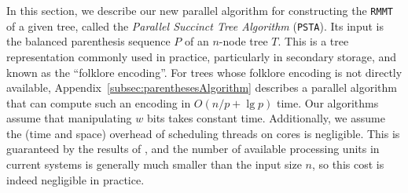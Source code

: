 In this section, we describe our new parallel algorithm for constructing
the {\tt RMMT} of a given tree, called the \emph{Parallel Succinct Tree
  Algorithm} ({\tt PSTA}).
Its input is the balanced parenthesis sequence $P$ of an $n$-node
tree $T$.
This is a tree representation commonly used in practice, particularly in
secondary storage, and known as the ``folklore encoding''.
For trees whose folklore encoding is not directly available,
Appendix~\ref{subsec:parenthesesAlgorithm} describes a parallel algorithm that
can compute such an encoding in $O(n/p + \lg p)$ time.
Our algorithms assume that manipulating $w$ bits takes constant time.
Additionally, we assume the (time and space) overhead
of scheduling threads on cores is negligible. This is
guaranteed by the results of \cite{Blumofe:1999:SMC:324133.324234},
and the number of available processing units in current
systems is generally much smaller than the input size $n$, so this
cost is indeed negligible in practice.

